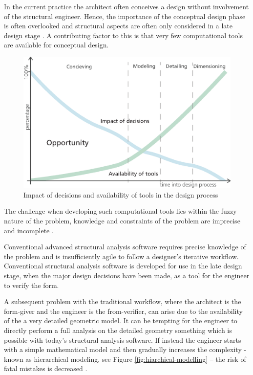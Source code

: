 In the current practice the architect often conceives a design without involvement of the structural engineer. Hence, the importance of the conceptual design phase is often overlooked and structural aspects are often only considered in a late design stage \cite{schlaich2006challenges}. A contributing factor to this is that very few computational tools are available for conceptual design. 

\begin{figure}
  \includegraphics[width=350pt]{graphics/impact-tools.eps}
  \caption{Impact of decisions and availability of tools in the design process \cite{Hsu2000}}
  \label{fig:impact-tools}
\end{figure}


The challenge when developing such computational tools lies within the fuzzy nature of the problem, knowledge and constraints of the problem are imprecise and incomplete \cite{Hsu2000}.

Conventional advanced structural analysis software requires precise knowledge of the problem and is insufficiently agile to follow a designer’s iterative workflow. Conventional structural analysis software is developed for use in the late design stage, when the major design decisions have been made, as a tool for the engineer to verify the form. 

A subsequent problem with the traditional workflow, where the architect is the form-giver and the engineer is the from-verifier, can arise due to the availability of the a very detailed geometric model. It can be tempting for the engineer to directly perform a full analysis on the detailed geometry something which is possible with today’s structural analysis software. If instead the engineer starts with a simple mathematical model and then gradually increases the complexity - known as hierarchical modeling, see Figure \ref{fig:hiarchical-modelling} – the risk of fatal mistakes is decreased \cite{Bathe2006}. 

